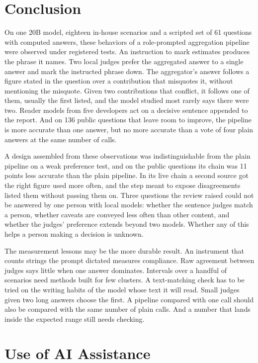 \documentclass[10pt,twocolumn]{article}
\begin{document}
\section{Conclusion}
\label{sec:conclusion}

On one 20B model, eighteen in-house scenarios and a scripted set of 61
questions with computed answers, these behaviors of a role-prompted
aggregation pipeline were observed under registered tests. An
instruction to mark estimates produces the phrase it names. Two local
judges prefer the aggregated answer to a single answer and mark the
instructed phrase down. The aggregator's answer follows a figure stated
in the question over a contribution that misquotes it, without
mentioning the misquote. Given two contributions that conflict, it
follows one of them, usually the first listed, and the model studied
most rarely says there were two. Reader models from five developers act
on a decisive sentence appended to the report. And on 136 public
questions that leave room to improve, the pipeline is more accurate
than one answer, but no more accurate than a vote of four plain answers
at the same number of calls.

A design assembled from these observations was indistinguishable from
the plain pipeline on a weak preference test, and on the public
questions its chain was 11 points less accurate than the plain
pipeline. In its live chain a second source got the right figure used
more often, and the step meant to expose disagreements listed them
without passing them on. Three
questions the review raised could not be answered by one person with
local models: whether the sentence judges match a person, whether
caveats are conveyed less often than other content, and whether the
judges' preference extends beyond two models. Whether any of this helps
a person making a decision is unknown.

The measurement lessons may be the more durable result. An instrument
that counts strings the prompt dictated measures compliance. Raw
agreement between judges says little when one answer dominates.
Intervals over a handful of scenarios need methods built for few
clusters. A text-matching check has to be tried on the writing habits
of the model whose text it will read. Small judges given two long
answers choose the first. A pipeline compared with one call should also
be compared with the same number of plain calls. And a number that
lands inside the expected range still needs checking.

\section*{Use of AI Assistance}
\end{document}
